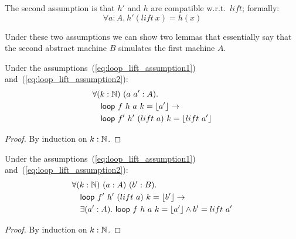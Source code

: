 The second assumption is that $h'$ and $h$ are compatible w.r.t.\ $lift$; formally:
\begin{equation}
  \label{eq:loop_lift_assumption2}
  \forall a:A.~h'(lift~x)=h(x)
\end{equation}

Under these two assumptions we can show two lemmas that essentially say that the second abstract machine $B$ simulates the first machine $A$.
\begin{lemma}
  \label{lem:loop_lift}
  Under the assumptions~(\ref{eq:loop_lift_assumption1}) and~(\ref{eq:loop_lift_assumption2}):
  \begin{alignat*}{1}
    & \forall (k:\mathbb{N})~(a~a' : A). \\
    & \quad \mathsf{loop}~f ~h ~a        ~k = \left\lfloor {a'} \right\rfloor \rightarrow \\
    & \quad \mathsf{loop}~f'~h'~(lift~a) ~k = \left\lfloor {lift~a'} \right\rfloor
  \end{alignat*}
\end{lemma}
\begin{proof}
  By induction on $k:\mathbb{N}$.
\end{proof}
\begin{lemma}
  \label{lem:loop_unlift}
  Under the assumptions~(\ref{eq:loop_lift_assumption1}) and~(\ref{eq:loop_lift_assumption2}):
  \begin{alignat*}{1}
    & \forall (k:\mathbb{N})~(a:A)~(b':B). \\
    & \quad \mathsf{loop}~f'~h'~(lift~a)~k = \left\lfloor {b'} \right\rfloor \rightarrow \\
    & \quad \exists (a':A).~\mathsf{loop}~f~h~a~k = \left\lfloor {a'} \right\rfloor \land b'=lift~a'
  \end{alignat*}
\end{lemma}
\begin{proof}
  By induction on $k:\mathbb{N}$.
\end{proof}

